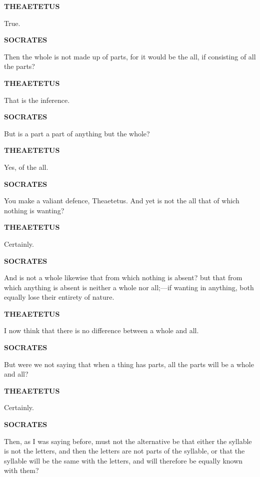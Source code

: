 \documentclass[11pt,letter]{article}
\begin{document}
\par \textbf{THEAETETUS}
\par   True.

\par \textbf{SOCRATES}
\par   Then the whole is not made up of parts, for it would be the all, if consisting of all the parts?

\par \textbf{THEAETETUS}
\par   That is the inference.

\par \textbf{SOCRATES}
\par   But is a part a part of anything but the whole?

\par \textbf{THEAETETUS}
\par   Yes, of the all.

\par \textbf{SOCRATES}
\par   You make a valiant defence, Theaetetus. And yet is not the all that of which nothing is wanting?

\par \textbf{THEAETETUS}
\par   Certainly.

\par \textbf{SOCRATES}
\par   And is not a whole likewise that from which nothing is absent? but that from which anything is absent is neither a whole nor all;—if wanting in anything, both equally lose their entirety of nature.

\par \textbf{THEAETETUS}
\par   I now think that there is no difference between a whole and all.

\par \textbf{SOCRATES}
\par   But were we not saying that when a thing has parts, all the parts will be a whole and all?

\par \textbf{THEAETETUS}
\par   Certainly.

\par \textbf{SOCRATES}
\par   Then, as I was saying before, must not the alternative be that either the syllable is not the letters, and then the letters are not parts of the syllable, or that the syllable will be the same with the letters, and will therefore be equally known with them?
\end{document}
